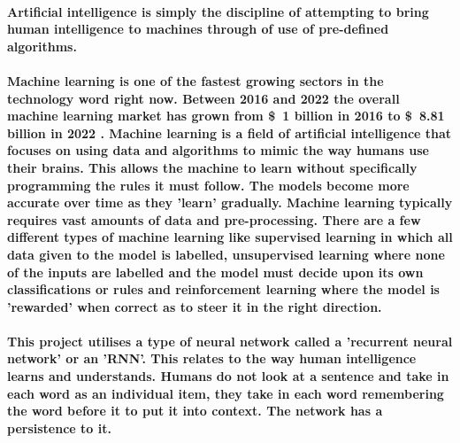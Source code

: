 \paragraph{Artificial intelligence is simply the discipline of attempting to bring human intelligence to machines through of use of pre-defined algorithms. }

\paragraph{Machine learning is one of the fastest growing sectors in the technology word right now. Between 2016 and 2022 the overall machine learning market has grown from \$\ 1 billion in 2016 to \$\ 8.81 billion in 2022 \cite{venturebeat}.
Machine learning is a field of artificial intelligence that focuses on using data and algorithms to mimic the way humans use their brains. This allows the machine to learn without specifically programming the rules it must follow. The models become more accurate over time as they 'learn' gradually. Machine learning typically requires vast amounts of data and pre-processing. There are a few different types of machine learning like supervised learning in which all data given to the model is labelled, unsupervised learning where none of the inputs are labelled and the model must decide upon its own classifications or rules and reinforcement learning where the model is 'rewarded' when correct as to steer it in the right direction.}

\paragraph{This project utilises a type of neural network called a 'recurrent neural network' or an 'RNN'. This relates to the way human intelligence learns and understands. Humans do not look at a sentence and take in each word as an individual item, they take in each word remembering the word before it to put it into context. The network has a persistence to it. }

